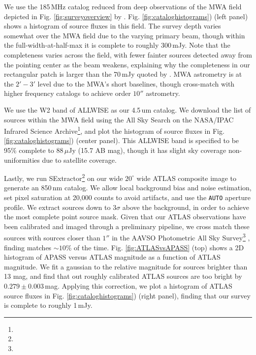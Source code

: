 \documentclass{emulateapj}
\begin{document}
We use the 185\,MHz catalog reduced from deep observations of the MWA field depicted in Fig. \ref{fig:surveyoverview} by \citep{PattiCatalog1}. Fig. \ref{fig:cataloghistograms}) (left panel) shows a histogram of source fluxes in this field. The survey depth varies somewhat over the MWA field due to the varying primary beam, though within the full-width-at-half-max it is complete to roughly 300\,mJy. Note that the completeness varies across the field, with fewer fainter sources detected away from the pointing center as the beam weakens, explaining why the completeness in our rectangular patch is larger than the 70\,mJy quoted by \citet{PattiCatalog1}. MWA astrometry is at the $2'-3'$ level due to the MWA's short baselines, though \citep{PattiCatalog1} cross-match with higher frequency catalogs to achieve order $10''$ astrometry. 

We use the W2 band of ALLWISE \citep{Wright2010,allwise} as our 4.5\,um catalog. We download the list of sources within the MWA field using the All Sky Search on the NASA/IPAC Infrared Science Archive\footnote{}, and plot the histogram of source fluxes in Fig. \ref{fig:cataloghistograms}) (center panel). This ALLWISE band is specified to be 95\% complete to 88\,$\mu$Jy (15.7 AB mag), though it has slight sky coverage non-uniformities due to satellite coverage.

Lastly, we run SExtractor\footnote{} \citep{sextractor} on our wide $20^\circ$ wide ATLAS composite image to generate an 850\,nm catalog. We allow local background bias and noise estimation, set pixel saturation at 20,000 counts to avoid artifacts, and use the {\tt AUTO} aperture profile. We extract sources down to $3\sigma$ above the background, in order to achieve the most complete point source mask. Given that our ATLAS observations have been calibrated and imaged through a preliminary pipeline, we cross match these sources with sources closer than $1''$ in the AAVSO Photometric All Sky Survey\footnote{} \citep{apass}, finding matches $\sim10\%$ of the time. Fig. \ref{fig:ATLASvsAPASS} (top) shows a 2D histogram of APASS versus ATLAS magnitude as a function of ATLAS magnitude. We fit a gaussian to the relative magnitude for sources brighter than 13 mag, and find that out roughly calibrated ATLAS sources are too bright by $0.279\pm0.003$\,mag. Applying this correction, we plot a histogram of ATLAS source fluxes in Fig. \ref{fig:cataloghistograms}) (right panel), finding that our survey is complete to roughly 1\,mJy.
\end{document}
